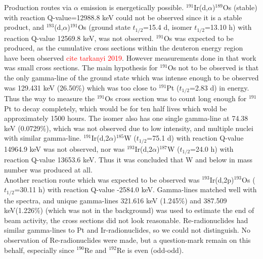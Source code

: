 \documentclass[a4paper,11pt,twoside]{book}
\begin{document}
\noindent 
Production routes via $\alpha$ emission is energetically possible.  $^{191}$Ir(d,$\alpha$)$^{189}$Os (stable) with reaction Q-value=12988.8 keV could not be observed since it is a stable product, and $^{193}$(d,$\alpha$)$^{191}$Os (ground state $t_{1/2}$=15.4 d, isomer $t_{1/2}$=13.10 h) with reaction Q-value 12569.8 keV, was not observed. $^{191}$Os was expected to be produced, as the cumulative cross sections within the deuteron energy region have been observed \textcolor{red}{cite tarkanyi 2019}. However measurements done in that work was small cross sections. The main hypothesis for $^{191}$Os not to be observed is that the only gamma-line of the ground state which was intense enough to be observed was 129.431 keV (26.50\%) which was too close to $^{191}$Pt ($t_{1/2}$=2.83 d) in energy. Thus the way to measure the $^{191}$Os cross section was to count long enough for $^{191}$Pt to decay completely, which would be for ten half lives which wold be approximately 1500 hours. The isomer also has one single gamma-line at 74.38 keV (0.0729\%), which was not observed due to low intensity, and multiple nuclei with similar gamma-line. $^{191}$Ir(d,2$\alpha$)$^{185}$W ($t_{1/2}$=75.1 d) with reaction Q-value 14964.9 keV was not observed, nor was $^{193}$Ir(d,2$\alpha$)$^{187}$W ($t_{1/2}$=24.0 h) with reaction Q-value 13653.6 keV. Thus it was concluded that W and below in mass number was produced at all. \\

\noindent 
Another reaction route which was expected to be observed was $^{193}$Ir(d,2p)$^{193}$Os ($t_{1/2}$=30.11 h) with reaction Q-value -2584.0 keV. Gamma-lines matched well with the spectra, and unique gamma-lines 321.616 keV (1.245\%) and 387.509 keV(1.226\%) (which was not in the background) was used to estimate the end of beam activity, the cross sections did not look reasonable. Re-radionuclides had similar gamma-lines to Pt and Ir-radionuclides, so we could not distinguish. No observation of Re-radionuclides were made, but a question-mark remain on this behalf, especially since $^{190}$Re and $^{192}$Re is even (odd-odd).  




\end{document}
